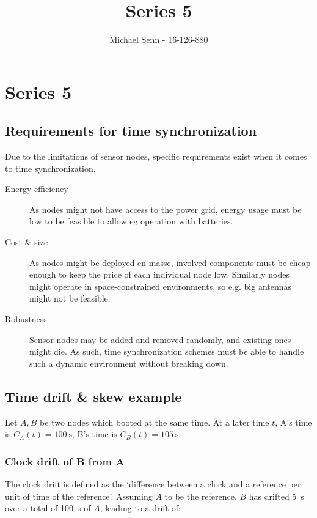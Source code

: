 \documentclass[a4paper]{scrreprt}
\title{Series 5}
\author{Michael Senn \maillink{michael.senn@students.unibe.ch} - 16-126-880}
\date{\printdate}
\begin{document}
\maketitle


\setcounter{chapter}{4}

\chapter{Series 5}

\section{Requirements for time synchronization}

Due to the limitations of sensor nodes, specific requirements exist when it
comes to time synchronization.

\begin{description}
		\item[Energy efficiency] As nodes might not have access to the power
				grid, energy usage must be low to be feasible to allow eg
				operation with batteries.
		\item[Cost \& size] As nodes might be deployed en masse, involved
				components must be cheap enough to keep the price of each
				individual node low. Similarly nodes might operate in
				space-constrained environments, so e.g. big antennas might not
				be feasible.
		\item[Robustness] Sensor nodes may be added and removed randomly, and
				existing ones might die. As such, time synchronization schemes
				must be able to handle such a dynamic environment without
				breaking down.
\end{description}

\section{Time drift \& skew example}

Let $A, B$ be two nodes which booted at the same time. At a later time $t$, A's
time is $C_A(t) = \SI{100}{\s}$, B's time is $C_B(t) = \SI{105}{\s}$.

\subsection{Clock drift of B from A}

The clock drift is defined as the `difference between a clock and a reference
per unit of time of the reference'. Assuming $A$ to be the reference, $B$ has
drifted \SI{5}{\s} over a total of \SI{100}{\s} of $A$, leading to a drift of:
\end{document}
